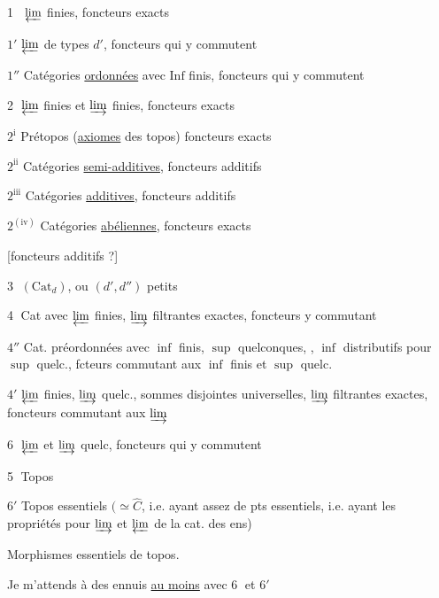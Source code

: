 \textcircled{\textcircled{1}} $\varprojlim$ finies, foncteurs exacts

\textcircled{\textcircled{$1'$}} $\varprojlim$ de types $d'$, foncteurs qui y commutent

\textcircled{$1''$} Catégories \uline{ordonnées} avec $\mathrm{Inf}$ finis, foncteurs qui y commutent

\textcircled{2} $\varprojlim$ finies et $\varinjlim$ finies, foncteurs exacts

\textcircled{$2^{\mathrm i}$} Prétopos (\uline{axiomes}  des topos) foncteurs exacts

\textcircled{$2^{\mathrm{ii}}$} Catégories \uline{semi-additives}, foncteurs additifs

\textcircled{$2^{\mathrm{iii}}$} Catégories \uline{additives}, foncteurs additifs

\textcircled{$2^{(\mathrm{iv})}$} Catégories \uline{abéliennes}, foncteurs exacts

\hfill[foncteurs additifs ?]


\textcircled{3} $(\mathrm{Cat}_{d})$, ou $(d',d'')$ petits

\textcircled{4} Cat avec $\varprojlim$ finies, $\varinjlim$ filtrantes exactes, foncteurs y commutant

\textcircled{$4''$} Cat. préordonnées avec $\inf$ finis, $\sup$ quelconques, , $\inf$ distributifs pour $\sup$ quelc., fcteurs commutant aux $\inf$ finis et $\sup$ quelc.

\textcircled{$4'$} $\varprojlim$ finies, $\varinjlim$ quelc., sommes disjointes universelles, $\varinjlim$ filtrantes exactes, foncteurs  commutant aux $\varinjlim$

\textcircled{6} $\varprojlim$ et $\varinjlim$ quelc, foncteurs qui y commutent

\textcircled{5} Topos

\textcircled{$6'$} Topos essentiels $(\simeq\widehat C$, i.e. ayant assez de pts essentiels, i.e. ayant les propriétés  pour $\varinjlim$ et $\varprojlim$ de la cat. des ens)

Morphismes essentiels de topos.

Je m'attends à des ennuis  \uline{au moins} avec \textcircled{6} et \textcircled{$6'$}
